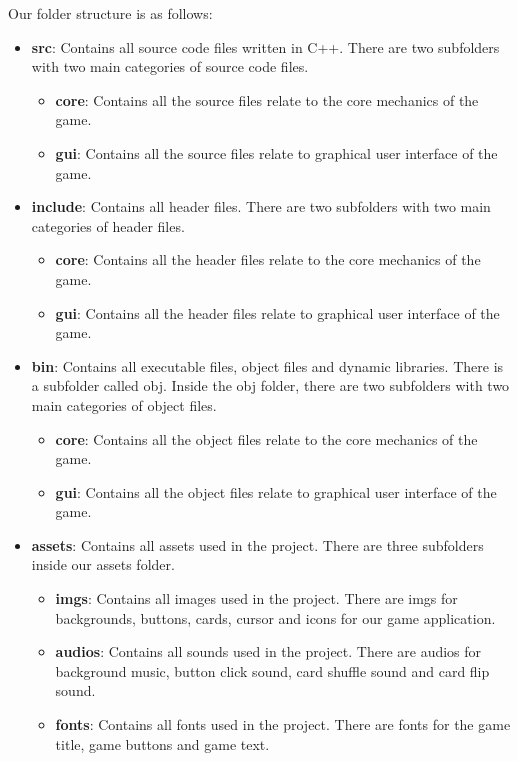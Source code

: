 Our folder structure is as follows:
\begin{itemize}
    \item \textbf{src}: Contains all source code files written in C++. There are two subfolders with two main categories of source code files.
    \begin{itemize}
        \item \textbf{core}: Contains all the source files relate to the core mechanics of the game.
        \item \textbf{gui}: Contains all the source files relate to graphical user interface of the game.
    \end{itemize}
    \item \textbf{include}: Contains all header files. There are two subfolders with two main categories of header files.
    \begin{itemize}
        \item \textbf{core}: Contains all the header files relate to the core mechanics of the game.
        \item \textbf{gui}: Contains all the header files relate to graphical user interface of the game.
    \end{itemize}
    \item \textbf{bin}: Contains all executable files, object files and dynamic libraries. There is a subfolder called obj. Inside the obj folder, there are two subfolders with two main categories of object files.
    \begin{itemize}
        \item \textbf{core}: Contains all the object files relate to the core mechanics of the game.
        \item \textbf{gui}: Contains all the object files relate to graphical user interface of the game.
    \end{itemize}
    \item \textbf{assets}: Contains all assets used in the project. There are three subfolders inside our assets folder.
    \begin{itemize}
        \item \textbf{imgs}: Contains all images used in the project. There are imgs for backgrounds, buttons, cards, cursor and icons for our game application.
        \item \textbf{audios}: Contains all sounds used in the project. There are audios for background music, button click sound, card shuffle sound and card flip sound.
        \item \textbf{fonts}: Contains all fonts used in the project. There are fonts for the game title, game buttons and game text.

\end{itemize}
\end{itemize}
